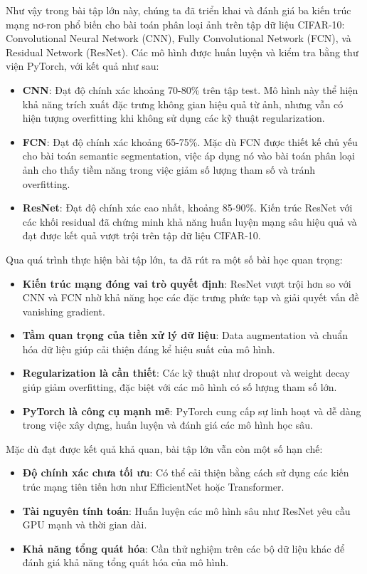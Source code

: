 \documentclass[main.tex]{subfiles}
\begin{document}
Như vậy trong bài tập lớn này, chúng ta đã triển khai và đánh giá ba kiến trúc mạng nơ-ron phổ biến cho bài toán phân loại ảnh trên tập dữ liệu CIFAR-10: Convolutional Neural Network (CNN), Fully Convolutional Network (FCN), và Residual Network (ResNet). Các mô hình được huấn luyện và kiểm tra bằng thư viện PyTorch, với kết quả như sau:

\begin{itemize}
    \item \textbf{CNN}: Đạt độ chính xác khoảng 70-80\% trên tập test. Mô hình này thể hiện khả năng trích xuất đặc trưng không gian hiệu quả từ ảnh, nhưng vẫn có hiện tượng overfitting khi không sử dụng các kỹ thuật regularization.
    \item \textbf{FCN}: Đạt độ chính xác khoảng 65-75\%. Mặc dù FCN được thiết kế chủ yếu cho bài toán semantic segmentation, việc áp dụng nó vào bài toán phân loại ảnh cho thấy tiềm năng trong việc giảm số lượng tham số và tránh overfitting.
    \item \textbf{ResNet}: Đạt độ chính xác cao nhất, khoảng 85-90\%. Kiến trúc ResNet với các khối residual đã chứng minh khả năng huấn luyện mạng sâu hiệu quả và đạt được kết quả vượt trội trên tập dữ liệu CIFAR-10.
\end{itemize}

Qua quá trình thực hiện bài tập lớn, ta đã rút ra một số bài học quan trọng:

\begin{itemize}
    \item \textbf{Kiến trúc mạng đóng vai trò quyết định}: ResNet vượt trội hơn so với CNN và FCN nhờ khả năng học các đặc trưng phức tạp và giải quyết vấn đề vanishing gradient.
    \item \textbf{Tầm quan trọng của tiền xử lý dữ liệu}: Data augmentation và chuẩn hóa dữ liệu giúp cải thiện đáng kể hiệu suất của mô hình.
    \item \textbf{Regularization là cần thiết}: Các kỹ thuật như dropout và weight decay giúp giảm overfitting, đặc biệt với các mô hình có số lượng tham số lớn.
    \item \textbf{PyTorch là công cụ mạnh mẽ}: PyTorch cung cấp sự linh hoạt và dễ dàng trong việc xây dựng, huấn luyện và đánh giá các mô hình học sâu.
\end{itemize}

Mặc dù đạt được kết quả khả quan, bài tập lớn vẫn còn một số hạn chế:

\begin{itemize}
    \item \textbf{Độ chính xác chưa tối ưu}: Có thể cải thiện bằng cách sử dụng các kiến trúc mạng tiên tiến hơn như EfficientNet hoặc Transformer.
    \item \textbf{Tài nguyên tính toán}: Huấn luyện các mô hình sâu như ResNet yêu cầu GPU mạnh và thời gian dài.
    \item \textbf{Khả năng tổng quát hóa}: Cần thử nghiệm trên các bộ dữ liệu khác để đánh giá khả năng tổng quát hóa của mô hình.
\end{itemize}
\end{document}
